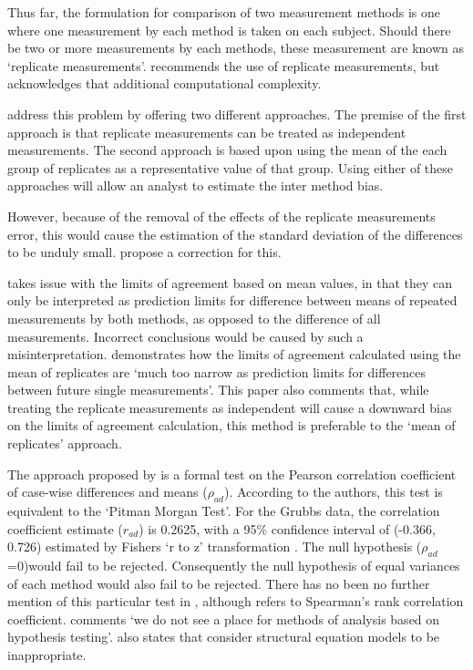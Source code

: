 \documentclass[MAIN.tex]{subfiles}
\begin{document}
	Thus far, the formulation for comparison of two measurement
	methods is one where one measurement by each method is taken on
	each subject. Should there be two or more measurements by each
	methods, these measurement are known as `replicate measurements'.
	\citet{BXC2008} recommends the use of replicate measurements, but
	acknowledges that  additional computational complexity.
	
	\citet*{BA86} address this problem by offering two different approaches. The premise of the first approach is that replicate
	measurements can be treated as independent measurements. The
	second approach is based upon using the mean of the each group of
	replicates as a representative value of that group. Using either
	of these approaches will allow an analyst to estimate the inter
	method bias.
	
	
	However, because of the removal of the effects of the replicate	measurements error, this would cause the estimation of the
	standard deviation of the differences to be unduly small.
	\citet*{BA86} propose a correction for this.
	
	\citet{BXC2008} takes issue with the limits of agreement based on
	mean values, in that they can only be interpreted as prediction
	limits for difference between means of repeated measurements by
	both methods, as opposed to the difference of all measurements.
	Incorrect conclusions would be caused by such a misinterpretation.
	\citet{BXC2008} demonstrates how the limits of agreement
	calculated using the mean of replicates are `much too narrow as
	prediction limits for differences between future single
	measurements'. This paper also comments that, while treating the
	replicate measurements as independent will cause a downward bias
	on the limits of agreement calculation, this method is preferable
	to the `mean of replicates' approach.
	
	The approach proposed by \citet{BA83} is a formal test on the Pearson correlation coefficient of case-wise differences and means
	($\rho_{ad}$). According to the authors, this test is equivalent
	to the `Pitman Morgan Test'. For the Grubbs data, the correlation
	coefficient estimate ($r_{ad}$) is 0.2625, with a 95\% confidence
	interval of (-0.366, 0.726) estimated by Fishers `r to z'
	transformation \citep*{Cohen}. The null hypothesis ($\rho_{ad}$
	=0)would fail to be rejected. Consequently the null hypothesis of
	equal variances of each method would also fail to be rejected.
	There has no been no further mention of this particular test in
	\citet{BA86}, although \citet{BA99} refers to Spearman's rank
	correlation coefficient. \citet{BA99} comments `we do not see a
	place for methods of analysis based on hypothesis testing'.
	\citet{BA99} also states that consider structural equation models
	to be inappropriate.
	
\end{document}
